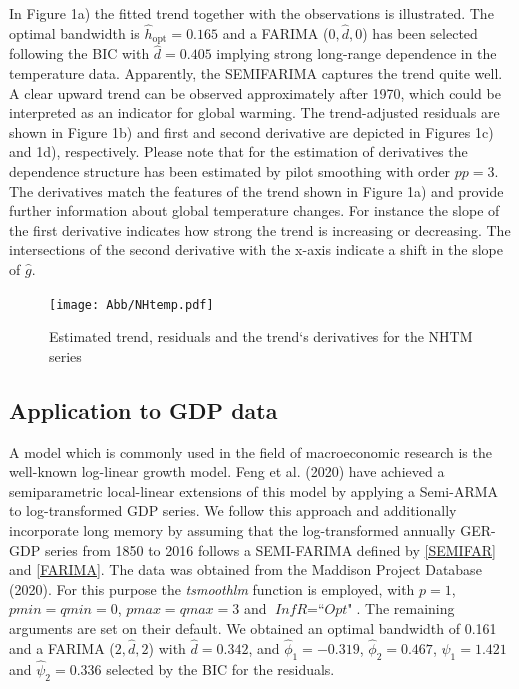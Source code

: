 \documentclass[12pt]{article}
\begin{document}
In Figure 1a) the fitted trend together with the observations is illustrated. The optimal bandwidth is $\hat{h}_{\text{opt}} = 0.165$ and a FARIMA ($0, \hat{d}, 0$) has been selected following the BIC with $\hat{d} = 0.405$ implying strong long-range dependence in the temperature data. Apparently, the SEMIFARIMA captures the trend quite well. A clear upward trend can be observed approximately after 1970, which could be interpreted as an indicator for global warming. The trend-adjusted residuals are shown in Figure 1b) and first and second derivative are depicted in Figures 1c) and 1d), respectively. Please note that for the estimation of derivatives the dependence structure has been estimated by pilot smoothing with order $\textit{pp} = 3$. The derivatives match the features of the trend shown in Figure 1a) and provide further information about global temperature changes. For instance the slope of the first derivative indicates how strong the trend is increasing or decreasing. The intersections of the second derivative with the x-axis indicate a shift in the slope of $\hat{g}$. 
 
\begin{figure}[h]
		\texttt{[image: Abb/NHtemp.pdf]}
		\caption{Estimated trend, residuals and the trend`s derivatives for the NHTM series}
\end{figure}



\subsection{Application to GDP data}
A model which is commonly used in the field of macroeconomic research is the well-known log-linear growth model. Feng et al. (2020) have achieved a semiparametric local-linear extensions of this model by applying a Semi-ARMA to log-transformed GDP series. We follow this approach and additionally incorporate long memory by assuming that the log-transformed annually GER-GDP series from 1850 to 2016 follows a SEMI-FARIMA defined by \eqref{SEMIFAR} and \eqref{FARIMA}. The data was obtained from the Maddison Project Database (2020). For this purpose the \textit{tsmoothlm} function is employed, with $\textit{p} = 1$, $\textit{pmin} = \textit{qmin} = 0$, $\textit{pmax} = \textit{qmax} = 3$ and $\textit{InfR} = \textit{``Opt"}$. The remaining arguments are set on their default. We obtained an optimal bandwidth of 0.161 and a FARIMA ($2,\hat{d},2$) with $\hat{d} = 0.342$, and $\hat{\phi}_1 = -0.319$, $\hat{\phi}_2 = 0.467$, $\hat{\psi}_1 = 1.421$ and $\hat{\psi}_2 = 0.336$ selected by the BIC for the residuals.
\end{document}
